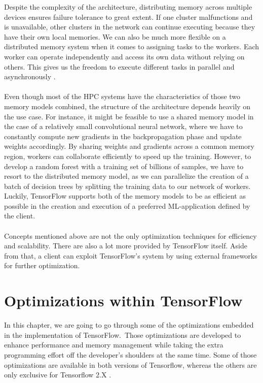 \documentclass[ieeetran]{article}
\begin{document}
\hspace{-0.52cm}Despite the complexity of the architecture, distributing memory across multiple devices ensures failure tolerance to great extent. If one cluster malfunctions and is unavailable, other clusters in the network can continue executing because they have their own local memories. We can also be much more flexible on a distributed memory system when it comes to assigning tasks to the workers. Each worker can operate independently and access its own data without relying on others. This gives us the freedom to execute different tasks in parallel and asynchronously \cite{second} \cite{third}.
\\ \\Even though most of the HPC systems have the characteristics of those two memory models combined, the structure of the architecture depends heavily on the use case. For instance, it might be feasible to use a shared memory model in the case of a relatively small convolutional neural network, where we have to constantly compute new gradients in the backpropagation phase and update weights accordingly. By sharing weights and gradients across a common memory region, workers can collaborate efficiently to speed up the training. However, to develop a random forest with a training set of billions of samples, we have to resort to the distributed memory model, as we can parallelize the creation of a batch of decision trees by splitting the training data to our network of workers. Luckily, TensorFlow supports both of the memory models to be as efficient as possible in the creation and execution of a preferred ML-application defined by the client. 
\\ \\Concepts mentioned above are not the only optimization techniques for efficiency and scalability. There are also a lot more provided by TensorFlow itself. Aside from that, a client can exploit TensorFlow's system by using external frameworks for further optimization. 


\section{Optimizations within TensorFlow} %
\label{sec:optimizations_tensorflow}
In this chapter, we are going to go through some of the optimizations embedded in the implementation of TensorFlow.\ Those optimizations are developed to enhance performance and memory management while taking the extra programming effort off the developer's shoulders at the same time. Some of those optimizations are available in both versions of Tensorflow, whereas the others are only exclusive for Tensorflow 2.X \cite{first}.
\end{document}
